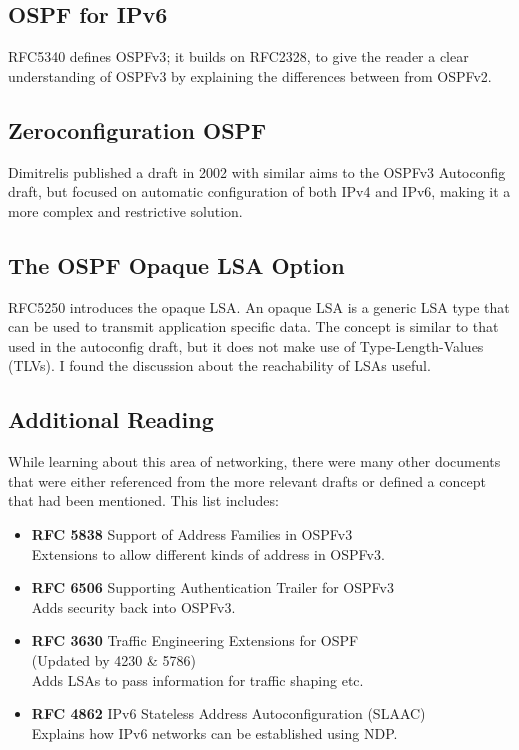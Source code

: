 \subsection{OSPF for IPv6}
RFC5340 defines OSPFv3\cite{rfc5340}; it builds on RFC2328, to give the
reader a clear understanding of OSPFv3 by explaining the differences between
from OSPFv2. 

\subsection{Zeroconfiguration OSPF}
Dimitrelis\cite{draft-dimitri-zospf-00} published a draft in 2002 with similar
aims to the OSPFv3 Autoconfig draft, but focused on automatic configuration of
both IPv4 and IPv6, making it a more complex and restrictive solution. 

\subsection{The OSPF Opaque LSA Option}
RFC5250\cite{rfc5250} introduces the opaque LSA\@. An opaque LSA is a generic
LSA type that can be used to transmit application specific data. The concept is
similar to that used in the autoconfig draft, but it does not make use
of Type-Length-Values (TLVs). I found the
discussion about the reachability of LSAs useful.

\subsection{Additional Reading}
While learning about this area of networking, there were many other documents
that were either referenced from the more relevant drafts or defined a concept
that had been mentioned. This list includes:

\begin{itemize} 
  \item {\bf RFC 5838} Support of Address Families in OSPFv3 \cite{rfc5838}
	\\ Extensions to allow different kinds of address in OSPFv3.
  
\item {\bf RFC 6506} Supporting Authentication Trailer for OSPFv3  \cite{rfc6506}
	\\ Adds security back into OSPFv3.

	\item {\bf RFC 3630}  Traffic Engineering Extensions
	for OSPF \cite{rfc3630} 
	\\ (Updated by 4230 \& 5786) \cite{rfc4230}\cite{rfc5786} 
	\\ Adds LSAs to pass information for traffic shaping etc.\@
  
\item {\bf RFC 4862} IPv6 Stateless Address Autoconfiguration (SLAAC) \cite{rfc4862}
	\\ Explains how IPv6 networks can be established using NDP.\@

\end{itemize}

